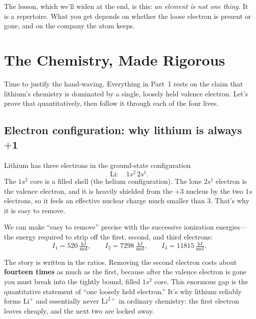 \documentclass[11pt, letterpaper]{article}
\newcommand{\Li}{\text{Li}}
\newcommand{\Lip}{\text{Li}^{+}}
\begin{document}
The lesson, which we'll widen at the end, is this: \textit{an element is not one thing.} It is a repertoire. What you get depends on whether the loose electron is present or gone, and on the company the atom keeps.


\section{The Chemistry, Made Rigorous}

Time to justify the hand-waving. Everything in Part~1 rests on the claim that lithium's chemistry is dominated by a single, loosely held valence electron. Let's prove that quantitatively, then follow it through each of the four lives.

\subsection{Electron configuration: why lithium is always $\mathbf{+1}$}

Lithium has three electrons in the ground-state configuration
\begin{equation}
  \Li:\quad 1s^2\,2s^1 .
\end{equation}
The $1s^2$ core is a filled shell (the helium configuration). The lone $2s^1$ electron is the valence electron, and it is heavily shielded from the $+3$ nucleus by the two $1s$ electrons, so it feels an effective nuclear charge much smaller than $3$. That's why it is easy to remove.

We can make ``easy to remove'' precise with the successive ionization energies---the energy required to strip off the first, second, and third electrons:
\begin{equation}
  I_1 = 520\ \tfrac{\text{kJ}}{\text{mol}}, \qquad
  I_2 = 7298\ \tfrac{\text{kJ}}{\text{mol}}, \qquad
  I_3 = 11815\ \tfrac{\text{kJ}}{\text{mol}} .
\end{equation}

The story is written in the ratios. Removing the second electron costs about \textbf{fourteen times} as much as the first, because after the valence electron is gone you must break into the tightly bound, filled $1s^2$ core. This enormous gap is the quantitative statement of ``one loosely held electron.'' It's why lithium reliably forms $\Lip$ and essentially never $\text{Li}^{2+}$ in ordinary chemistry: the first electron leaves cheaply, and the next two are locked away.
\end{document}
